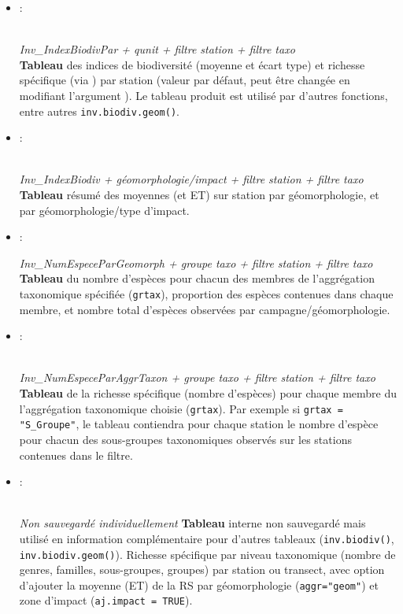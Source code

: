 \documentclass{article}
\begin{document}
\begin{itemize}

  \item[] \hypertarget{i1}{:} \\
    \emph{Inv\_IndexBiodivPar + qunit + filtre station + filtre taxo} \\
  \textbf{Tableau} des indices de biodiversité (moyenne et écart type)
  et richesse spécifique (via ) par station (valeur par défaut, peut être
  changée en modifiant l'argument ). Le tableau produit
  est utilisé par d'autres fonctions, entre autres \texttt{inv.biodiv.geom()}.

  \item[] \hypertarget{i2}{:}\\
    \emph{Inv\_IndexBiodiv + géomorphologie/impact + filtre station + filtre taxo}\\
    \textbf{Tableau} résumé des moyennes (et ET) sur station par
    géomorphologie, et par géomorphologie/type d'impact.

  \item[] \hypertarget{i3}{:}
    \emph{Inv\_NumEspeceParGeomorph + groupe taxo + filtre station +
      filtre taxo} \\
    \textbf{Tableau} du nombre d'espèces pour chacun des membres de
    l'aggrégation taxonomique spécifiée (\texttt{grtax}), proportion
    des espèces contenues dans chaque membre, et nombre total
    d'espèces observées par campagne/géomorphologie.

  \item[] \hypertarget{i4}{:}\\
    \emph{Inv\_NumEspeceParAggrTaxon + groupe taxo + filtre station + filtre taxo} \\
    \textbf{Tableau} de la richesse spécifique (nombre d'espèces) pour
 chaque membre du l'aggrégation taxonomique choisie
    (\texttt{grtax}). Par exemple si \texttt{grtax = "S\_Groupe"}, le
    tableau contiendra pour chaque station le nombre d'espèce pour
    chacun des sous-groupes taxonomiques observés sur les stations
    contenues dans le filtre.

  \item[]  \hypertarget{i5}{:}\\
    \emph{Non sauvegardé individuellement}
    \textbf{Tableau} interne non sauvegardé mais utilisé en
    information complémentaire pour d'autres tableaux
    (\texttt{inv.biodiv()}, \texttt{inv.biodiv.geom()}). Richesse
    spécifique par niveau taxonomique (nombre de genres, familles, sous-groupes,
    groupes) par station ou transect, avec option d'ajouter la moyenne
    (ET) de la RS par géomorphologie (\texttt{aggr="geom"}) et zone
    d'impact (\texttt{aj.impact = TRUE}).


\end{itemize}
\end{document}

